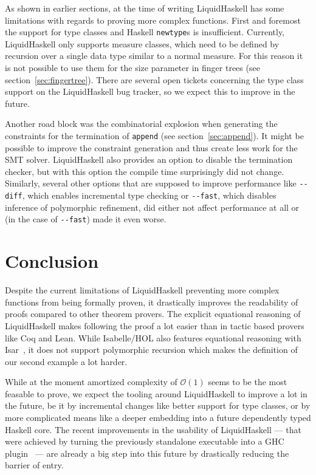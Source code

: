 \documentclass[sigplan,screen]{acmart}
\renewcommand\O[1]{$\mathcal{O}(#1)$}
\begin{document}
As shown in earlier sections, at the time of writing LiquidHaskell has some limitations with regards to proving more complex functions. First and foremost the support for type classes and Haskell \texttt{newtype}s is insufficient. Currently, LiquidHaskell only supports measure classes, which need to be defined by recursion over a single data type similar to a normal measure. For this reason it is not possible to use them for the size parameter in finger trees (see section~\ref{sec:fingertree}). There are several open tickets concerning the type class support on the LiquidHaskell bug tracker, so we expect this to improve in the future.

Another road block was the combinatorial explosion when generating the constraints for the termination of \texttt{append} (see section~\ref{sec:append}). It might be possible to improve the constraint generation and thus create less work for the SMT solver. LiquidHaskell also provides an option to disable the termination checker, but with this option the compile time surprisingly did not change. Similarly, several other options that are supposed to improve performance like \texttt{{-}{-}diff}, which enables incremental type checking or \texttt{{-}{-}fast}, which disables inference of polymorphic refinement, did either not affect performance at all or (in the case of \texttt{{-}{-}fast}) made it even worse.

\section{Conclusion}\label{sec:conclusion}

Despite the current limitations of LiquidHaskell preventing more complex functions from being formally proven, it drastically improves the readability of proofs compared to other theorem provers. The explicit equational reasoning of LiquidHaskell makes following the proof a lot easier than in tactic based provers like Coq and Lean. While Isabelle/HOL also features equational reasoning with Isar~\cite{isar}, it does not support polymorphic recursion which makes the definition of our second example a lot harder.

While at the moment amortized complexity of \O{1} seems to be the most feasable to prove, we expect the tooling around LiquidHaskell to improve a lot in the future, be it by incremental changes like better support for type classes, or by more complicated means like a deeper embedding into a future dependently typed Haskell core. The recent improvements in the usability of LiquidHaskell --- that were achieved by turning the previously standalone executable into a GHC plugin~\cite{lh_plugin} --- are already a big step into this future by drastically reducing the barrier of entry.
\end{document}
